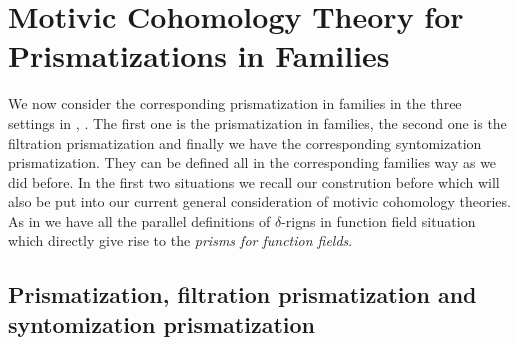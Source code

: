 \documentclass[12pt]{article}
\theoremstyle{definition}
\begin{document}
\newpage
\section{Motivic Cohomology Theory for Prismatizations in Families}\label{section9}


\indent We now consider the corresponding prismatization in families in the three settings in \cite{3BL}, \cite{3D}. The first one is the prismatization in families, the second one is the filtration prismatization and finally we have the corresponding syntomization prismatization. They can be defined all in the corresponding families way as we did before. In the first two situations we recall our constrution before which will also be put into our current general consideration of motivic cohomology theories. As in \cite{3BSI} we have all the parallel definitions of $\delta$-rigns in function field situation which directly give rise to the \textit{prisms for function fields}.

\subsection{Prismatization, filtration prismatization and syntomization prismatization}
\end{document}
